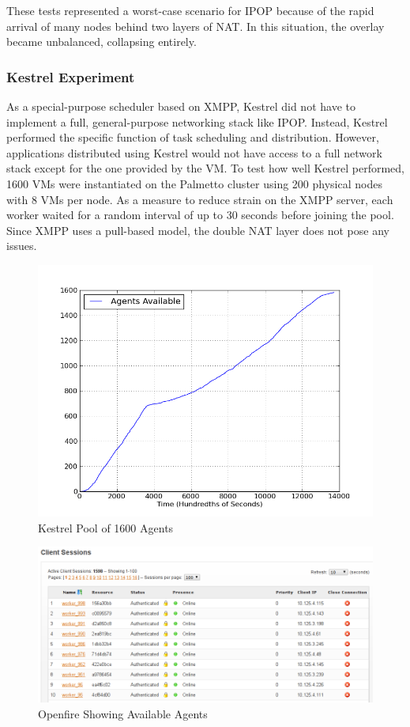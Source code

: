 These tests represented a worst-case scenario for IPOP because of
the rapid arrival of many nodes behind two layers of NAT. In this
situation, the overlay became unbalanced, collapsing entirely.


\subsubsection{\label{sub:Kestrel-Experiment}Kestrel Experiment} 
As a special-purpose scheduler based on XMPP, Kestrel did not have
to implement a full, general-purpose networking stack like IPOP. Instead,
Kestrel performed the specific function of task scheduling and distribution.
However, applications distributed using Kestrel would not have access
to a full network stack except for the one provided by the VM. To
test how well Kestrel performed, 1600 VMs were instantiated on the
Palmetto cluster using 200 physical nodes with 8 VMs per node. As
a measure to reduce strain on the XMPP server, each worker waited
for a random interval of up to 30 seconds before joining the pool.
Since XMPP uses a pull-based model, the double NAT layer does not
pose any issues.

%
\begin{figure}
\includegraphics[width=1\columnwidth]{figures/startup}
\caption{\label{fig:Kestrel-Pool}Kestrel Pool of 1600 Agents}
\end{figure}


%
\begin{figure}
\includegraphics[width=1\columnwidth]{figures/Screenshot}
\caption{\label{fig:Openfire-Showing-Available}Openfire Showing Available Agents}
\end{figure}


